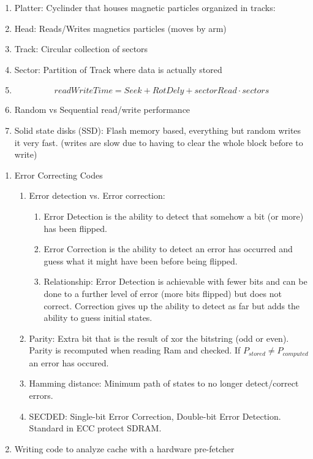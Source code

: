 \documentclass[12pt]{article}
\renewcommand{\=}[1]{\stackrel{#1}{=}} %
\theoremstyle{definition}
\theoremstyle{remark}
\begin{document}
\begin{center}
\begin{enumerate}
    \begin{enumerate}
    \item Platter: Cyclinder that houses magnetic particles organized
      in tracks:
    \item Head: Reads/Writes magnetics particles (moves by arm)
    \item Track: Circular collection of sectors
    \item Sector: Partition of Track where data is actually stored
    \item 
      \begin{equation}
        readWriteTime = Seek+RotDely +sectorRead\cdot sectors
      \end{equation}

    \item Random vs Sequential read/write performance
    \item Solid state disks (SSD): Flash memory based, everything but
      random writes it very fast. (writes are slow due to having to
      clear the whole block before to write)
    \end{enumerate}
    \begin{enumerate}
    \item Error Correcting Codes
      \begin{enumerate}
      \item Error detection vs. Error correction:
        \begin{enumerate}
        \item Error Detection is the ability to detect that somehow a
          bit (or more) has been flipped.
        \item Error Correction is the ability to detect an error has
          occurred and guess what it might have been before being flipped.
        \item Relationship: Error Detection is achievable with fewer
          bits and can be done to a further level of error (more bits
          flipped) but does not correct. Correction gives up the
          ability to detect as far but adds the ability to guess
          initial states.
        \end{enumerate}
      \item Parity: Extra bit that is the result of xor the bitstring
        (odd or even). Parity is recomputed when reading Ram and
        checked. If $P_{stored} \neq P_{computed}$ an error has occured.
      \item Hamming distance: Minimum path of states to no longer
        detect/correct errors.
      \item SECDED: Single-bit Error Correction, Double-bit Error
        Detection. Standard in ECC protect SDRAM.
      \end{enumerate}
    \item Writing code to analyze cache with a hardware pre-fetcher
    \end{enumerate}
  \end{enumerate}
    
\end{center}
\end{document}
